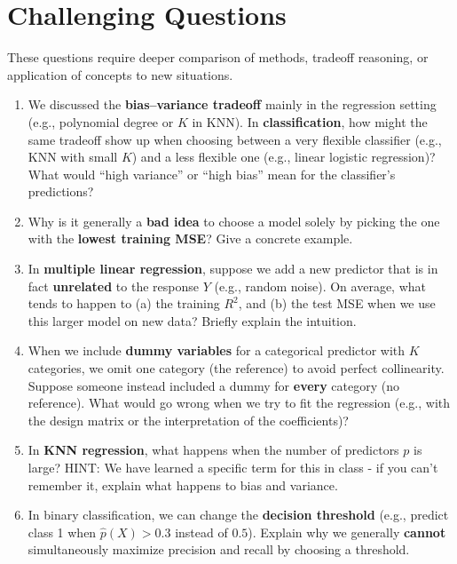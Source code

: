 \documentclass[11pt]{article}
\begin{document}
\newpage
\section*{Challenging Questions}

These questions require deeper comparison of methods, tradeoff reasoning, or application of concepts to new situations.

\bigskip

\begin{enumerate}[leftmargin=*, resume]

\item We discussed the \textbf{bias--variance tradeoff} mainly in the regression setting (e.g., polynomial degree or $K$ in KNN). In \textbf{classification}, how might the same tradeoff show up when choosing between a very flexible classifier (e.g., KNN with small $K$) and a less flexible one (e.g., linear logistic regression)? What would “high variance” or “high bias” mean for the classifier’s predictions?

\item Why is it generally a \textbf{bad idea} to choose a model solely by picking the one with the \textbf{lowest training MSE}? Give a concrete example.

\item In \textbf{multiple linear regression}, suppose we add a new predictor that is in fact \textbf{unrelated} to the response $Y$ (e.g., random noise). On average, what tends to happen to (a) the training $R^2$, and (b) the test MSE when we use this larger model on new data? Briefly explain the intuition.

\item When we include \textbf{dummy variables} for a categorical predictor with $K$ categories, we omit one category (the reference) to avoid perfect collinearity. Suppose someone instead included a dummy for \textbf{every} category (no reference). What would go wrong when we try to fit the regression (e.g., with the design matrix or the interpretation of the coefficients)?

\item In \textbf{KNN regression}, what happens when the number of predictors $p$ is large? HINT: We have learned a specific term for this in class - if you can't remember it, explain what happens to bias and variance. 

\item In binary classification, we can change the \textbf{decision threshold} (e.g., predict class 1 when $\hat{p}(X) > 0.3$ instead of $0.5$). Explain why we generally \textbf{cannot} simultaneously maximize precision and recall by choosing a threshold. 


\end{enumerate}
\end{document}
